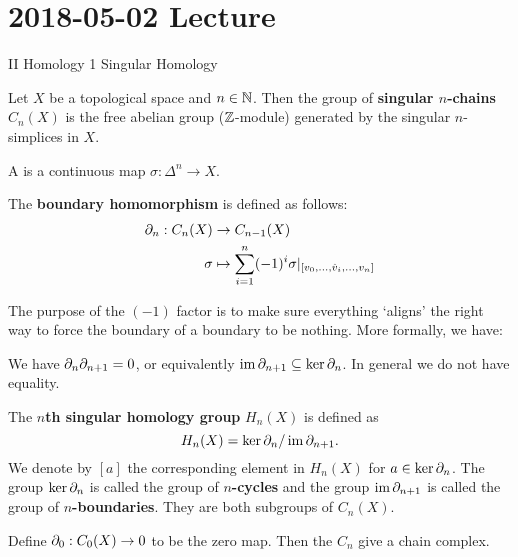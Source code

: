 \section{2018-05-02 Lecture}

II Homology
1 Singular Homology

\begin{defn}
  Let $X$ be a topological space and $n \in \mathbb{N}$.
  Then the group of \textbf{singular $n$-chains} $C_n(X)$ is the free abelian group ($\mathbb{Z}$-module) generated by the singular $n$-simplices in $X$.
\end{defn}

\begin{defn}
  A  is a continuous map $\sigma: \Delta^n \to X$.
\end{defn}

\begin{defn}
  The \textbf{boundary homomorphism} is defined as follows:
  \begin{align*}
    \partial_n: C_n(X) &\to C_{n-1}(X) \\
    \sigma &\mapsto \sum_{i=1}^n (-1)^i \sigma|_{[v_0,\ldots,\hat v_i,\ldots,v_n]}
  \end{align*}
\end{defn}

\begin{rmk}
  The purpose of the $(-1)$ factor is to make sure everything `aligns' the right way to force the boundary of a boundary to be nothing.
  More formally, we have:
\end{rmk}

\begin{prop}
  We have $\partial_n\partial_{n+1}=0$, or equivalently $\operatorname{im}\partial_{n+1} \subseteq \ker\partial_n$.
  In general we do not have equality.
\end{prop}

\begin{defn}
  The \textbf{$n$th singular homology group} $H_n(X)$ is defined as
  \[H_n(X) = \ker\partial_n/\operatorname{im}\partial_{n+1}.\]
  We denote by $[a]$ the corresponding element in $H_n(X)$ for $a \in \ker\partial_n$.
  The group $\ker\partial_n$ is called the group of \textbf{$n$-cycles} and the group $\operatorname{im}\partial_{n+1}$ is called the group of \textbf{$n$-boundaries}.
  They are both subgroups of $C_n(X)$.
\end{defn}

\begin{rmk}
  Define $\partial_0: C_0(X) \to 0$ to be the zero map.
  Then the $C_n$ give a chain complex.
\end{rmk}

